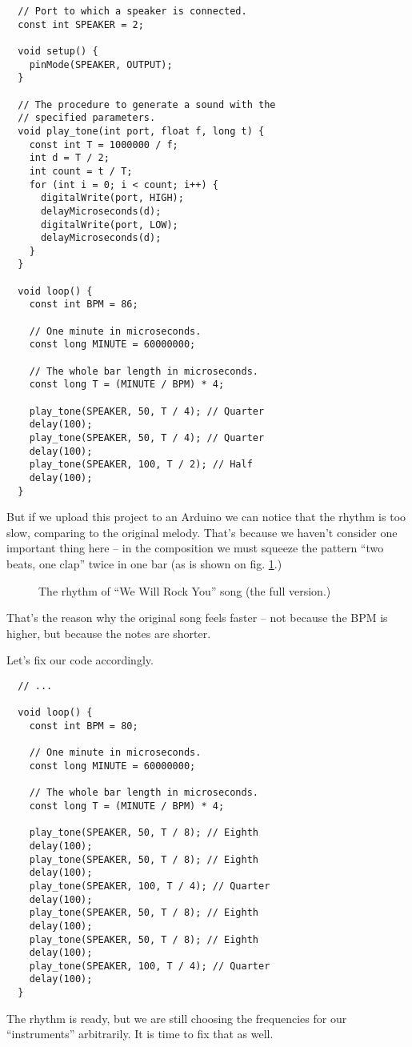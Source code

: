 \documentclass[../sparc.tex]{subfiles}
\begin{document}
\begin{verbatim}
  // Port to which a speaker is connected.
  const int SPEAKER = 2;

  void setup() {
    pinMode(SPEAKER, OUTPUT);
  }

  // The procedure to generate a sound with the
  // specified parameters.
  void play_tone(int port, float f, long t) {
    const int T = 1000000 / f;
    int d = T / 2;
    int count = t / T;
    for (int i = 0; i < count; i++) {
      digitalWrite(port, HIGH);
      delayMicroseconds(d);
      digitalWrite(port, LOW);
      delayMicroseconds(d);
    }
  }

  void loop() {
    const int BPM = 86;

    // One minute in microseconds.
    const long MINUTE = 60000000;

    // The whole bar length in microseconds.
    const long T = (MINUTE / BPM) * 4;

    play_tone(SPEAKER, 50, T / 4); // Quarter
    delay(100);
    play_tone(SPEAKER, 50, T / 4); // Quarter
    delay(100);
    play_tone(SPEAKER, 100, T / 2); // Half
    delay(100);
  }
\end{verbatim}

But if we upload this project to an Arduino we can notice that the rhythm is too
slow, comparing to the original melody.  That's because we haven't consider one
important thing here -- in the composition we must squeeze the pattern ``two
beats, one clap'' twice in one bar (as is shown on
fig. \ref{fig:lilypond-queen-2}.)

\begin{figure}[ht]
  \centering
  \caption{The rhythm of ``We Will Rock You'' song (the full version.)}
  \label{fig:lilypond-queen-2}
\end{figure}

That's the reason why the original song feels faster -- not because the BPM is
higher, but because the notes are shorter.

Let's fix our code accordingly.

\begin{verbatim}
  // ...

  void loop() {
    const int BPM = 80;

    // One minute in microseconds.
    const long MINUTE = 60000000;

    // The whole bar length in microseconds.
    const long T = (MINUTE / BPM) * 4;

    play_tone(SPEAKER, 50, T / 8); // Eighth
    delay(100);
    play_tone(SPEAKER, 50, T / 8); // Eighth
    delay(100);
    play_tone(SPEAKER, 100, T / 4); // Quarter
    delay(100);
    play_tone(SPEAKER, 50, T / 8); // Eighth
    delay(100);
    play_tone(SPEAKER, 50, T / 8); // Eighth
    delay(100);
    play_tone(SPEAKER, 100, T / 4); // Quarter
    delay(100);
  }
\end{verbatim}

The rhythm is ready, but we are still choosing the frequencies for our
``instruments'' arbitrarily.  It is time to fix that as well.
\end{document}
